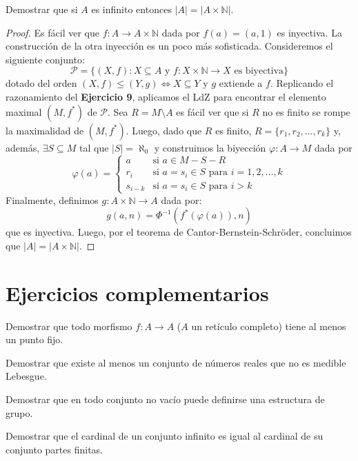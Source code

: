 \documentclass{article}
\theoremstyle{definition}
\newcommand{\N}{\mathbb{N}}
\newenvironment{ejercicio}[1]{\begin{trivlist}
\item[\hskip \labelsep {\bfseries Ejercicio}\hskip \labelsep {\bfseries #1.}]}{\end{trivlist}}
\begin{document}
\begin{ejercicio}{13}
    Demostrar que si \(A\) es infinito entonces \( |A| = |A \times \N| \).
\end{ejercicio}
\begin{proof}
    Es fácil ver que \( f: A \to A \times \N \) dada por \( f(a) = (a, 1) \) es inyectiva. La construcción de la otra inyección es un poco más sofisticada. Consideremos el siguiente conjunto: \[
        \mathcal{P} = \{ (X, f) : X \subseteq A \text{ y } f : X \times \N \to X \text{ es biyectiva} \}
    \]
    dotado del orden \( (X, f) \leq (Y, g) \iff X \subseteq Y \) y \( g \) extiende a \( f \). Replicando el razonamiento del \textbf{Ejercicio 9}, aplicamos el LdZ para encontrar el elemento maximal
    \( (M, f^*) \) de \( \mathcal{P} \). Sea \( R = M \setminus A \) es fácil ver que si \( R \) no es finito se rompe la maximalidad de \( (M, f^*) \). Luego, dado que \( R \) es finito,
    \( R = \{ r_1, r_2, \ldots, r_k \} \) y, además, \( \exists S \subseteq M \) tal que \( |S| = \aleph_0 \) y construimos la biyección \( \varphi: A \to M \) dada por \[
        \varphi(a) = \begin{cases}
            a       & \text{si } a \in M - S - R                                 \\
            r_i     & \text{si } a = s_i \in S \text{ para } i = 1, 2, \ldots, k \\
            s_{i-k} & \text{si } a = s_i \in S \text{ para } i > k
        \end{cases}
    \]
    Finalmente, definimos \( g : A \times \N \to A \) dada por: \[
        g(a, n) = \Phi^{-1}(f^*(\varphi(a)), n)
    \]
    que es inyectiva. Luego, por el teorema de Cantor-Bernstein-Schröder, concluimos que \( |A| = |A \times \N| \).
\end{proof}
\section*{Ejercicios complementarios}

\begin{ejercicio}{1}
    Demostrar que todo morfismo \( f:A\rightarrow A\) (\(A \) un retículo completo) tiene al menos un punto fijo.
\end{ejercicio}

\begin{ejercicio}{2}
    Demostrar que existe al menos un conjunto de números reales que no es medible Lebesgue.
\end{ejercicio}

\begin{ejercicio}{3}
    Demostrar que en todo conjunto no vacío puede definirse una estructura de grupo.
\end{ejercicio}

\begin{ejercicio}{4}
    Demostrar que el cardinal de un conjunto infinito es igual al cardinal de su conjunto partes finitas.
\end{ejercicio}
\end{document}
